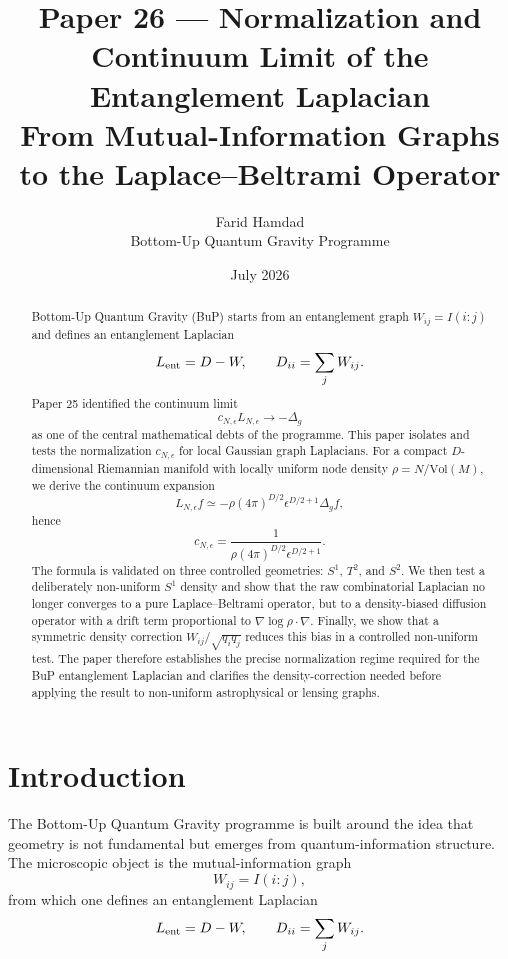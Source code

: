 \documentclass[11pt,a4paper]{article}
\title{\textbf{Paper 26 --- Normalization and Continuum Limit of the Entanglement Laplacian}\\[0.5em]
\large From Mutual-Information Graphs to the Laplace--Beltrami Operator}
\author{Farid Hamdad\\
\small Bottom-Up Quantum Gravity Programme}
\date{July 2026}
\newcommand{\Vol}{\mathrm{Vol}}
\begin{document}
\maketitle

\begin{abstract}
Bottom-Up Quantum Gravity (BuP) starts from an entanglement graph
\(W_{ij}=I(i:j)\) and defines an entanglement Laplacian
\[
L_{\rm ent}=D-W,\qquad D_{ii}=\sum_j W_{ij}.
\]
Paper 25 identified the continuum limit
\[
c_{N,\epsilon}L_{N,\epsilon}\longrightarrow -\Delta_g
\]
as one of the central mathematical debts of the programme. This paper isolates
and tests the normalization \(c_{N,\epsilon}\) for local Gaussian graph
Laplacians. For a compact \(D\)-dimensional Riemannian manifold with locally
uniform node density \(\rho=N/\Vol(M)\), we derive the continuum expansion
\[
L_{N,\epsilon}f\simeq
-\rho(4\pi)^{D/2}\epsilon^{D/2+1}\Delta_g f,
\]
hence
\[
\boxed{
c_{N,\epsilon}
=
\frac{1}
{\rho(4\pi)^{D/2}\epsilon^{D/2+1}}.
}
\]
The formula is validated on three controlled geometries: \(S^1\), \(T^2\), and
\(S^2\). We then test a deliberately non-uniform \(S^1\) density and show that
the raw combinatorial Laplacian no longer converges to a pure
Laplace--Beltrami operator, but to a density-biased diffusion operator with a
drift term proportional to \(\nabla\log\rho\cdot\nabla\). Finally, we show that
a symmetric density correction \(W_{ij}/\sqrt{q_iq_j}\) reduces this bias in a
controlled non-uniform test. The paper therefore establishes the precise
normalization regime required for the BuP entanglement Laplacian and clarifies
the density-correction needed before applying the result to non-uniform
astrophysical or lensing graphs.
\end{abstract}

\tableofcontents

\section{Introduction}

The Bottom-Up Quantum Gravity programme is built around the idea that geometry
is not fundamental but emerges from quantum-information structure. The
microscopic object is the mutual-information graph
\begin{equation}
W_{ij}=I(i:j),
\end{equation}
from which one defines an entanglement Laplacian
\begin{equation}
L_{\rm ent}=D-W,\qquad D_{ii}=\sum_j W_{ij}.
\end{equation}
\end{document}
